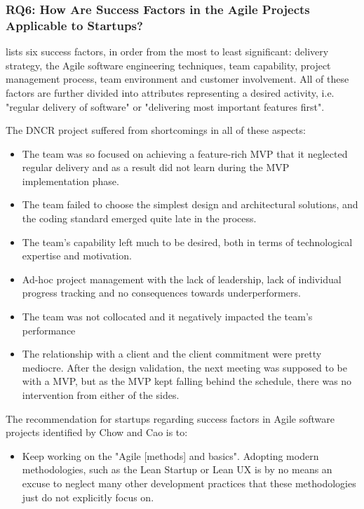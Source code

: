 \documentclass{article}
\begin{document}
\subsubsection{RQ6: How Are Success Factors in the Agile Projects \citep{cao2008agile} Applicable to Startups?}
\citeauthor{cao2008agile} lists six success factors, in order from the most to least significant: delivery strategy, the Agile software engineering techniques, team capability, project management process, team environment and customer involvement. All of these factors are further divided into attributes representing a desired activity, i.e. "regular delivery of software" or "delivering most important features first".

The DNCR project suffered from shortcomings in all of these aspects:
\begin{itemize}
\item The team was so focused on achieving a feature-rich MVP that it neglected regular delivery and as a result did not learn during the MVP implementation phase.
\item The team failed to choose the simplest design and architectural solutions, and the coding standard emerged quite late in the process.
\item The team's capability left much to be desired, both in terms of technological expertise and motivation.
\item Ad-hoc project management with the lack of leadership, lack of individual progress tracking and no consequences towards underperformers.
\item The team was not collocated and it negatively impacted the team's performance
\item The relationship with a client and the client commitment were pretty mediocre. After the design validation, the next meeting was supposed to be with a MVP, but as the MVP kept falling behind the schedule, there was no intervention from either of the sides.
\end{itemize}

The recommendation for startups regarding success factors in Agile software projects identified by Chow and Cao is to:
\begin{itemize}
\item Keep working on the "Agile [methods] and basics". Adopting modern methodologies, such as the Lean Startup or Lean UX is by no means an excuse to neglect many other development practices that these methodologies just do not explicitly focus on.
\end{itemize}
\end{document}
